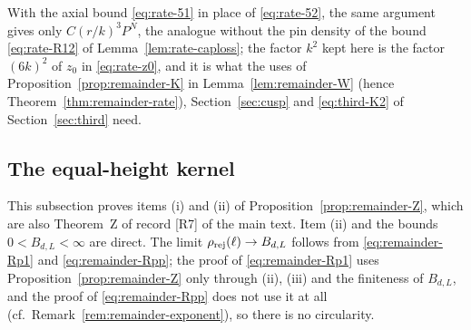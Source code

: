 With the axial bound \eqref{eq:rate-51} in place of \eqref{eq:rate-52}, the same argument gives only $C(r/k)^3P^N$, the analogue without the pin density of the bound \eqref{eq:rate-R12} of Lemma~\ref{lem:rate-caploss}; the factor $k^2$ kept here is the factor $(6k)^2$ of $z_0$ in \eqref{eq:rate-z0}, and it is what the uses of Proposition~\ref{prop:remainder-K} in Lemma~\ref{lem:remainder-W} (hence Theorem~\ref{thm:remainder-rate}), Section~\ref{sec:cusp} and \eqref{eq:third-K2} of Section~\ref{sec:third} need.

\subsection{The equal-height kernel}\label{ssec:remainder-Z}

This subsection proves items (i) and (ii) of Proposition~\ref{prop:remainder-Z}, which are also Theorem~Z of record [R7] of the main text. Item (ii) and the bounds $0<B_{d,L}<\infty$ are direct. The limit $\rho_{\mathrm{rej}}(\ell)\to B_{d,L}$ follows from \eqref{eq:remainder-Rp1} and \eqref{eq:remainder-Rpp}; the proof of \eqref{eq:remainder-Rp1} uses Proposition~\ref{prop:remainder-Z} only through (ii), (iii) and the finiteness of $B_{d,L}$, and the proof of \eqref{eq:remainder-Rpp} does not use it at all (cf.\ Remark~\ref{rem:remainder-exponent}), so there is no circularity.


